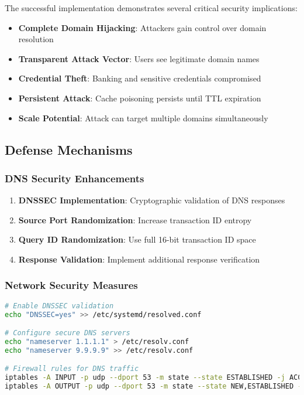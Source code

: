 \documentclass[12pt,a4paper]{article}
\begin{document}
The successful implementation demonstrates several critical security implications:

\begin{itemize}
    \item \textbf{Complete Domain Hijacking}: Attackers gain control over domain resolution
    \item \textbf{Transparent Attack Vector}: Users see legitimate domain names
    \item \textbf{Credential Theft}: Banking and sensitive credentials compromised
    \item \textbf{Persistent Attack}: Cache poisoning persists until TTL expiration
    \item \textbf{Scale Potential}: Attack can target multiple domains simultaneously
\end{itemize}

\subsection{Defense Mechanisms}

\subsubsection{DNS Security Enhancements}

\begin{enumerate}
    \item \textbf{DNSSEC Implementation}: Cryptographic validation of DNS responses
    \item \textbf{Source Port Randomization}: Increase transaction ID entropy
    \item \textbf{Query ID Randomization}: Use full 16-bit transaction ID space
    \item \textbf{Response Validation}: Implement additional response verification
\end{enumerate}

\subsubsection{Network Security Measures}

\begin{lstlisting}[language=bash, caption=DNS Security Configuration]
# Enable DNSSEC validation
echo "DNSSEC=yes" >> /etc/systemd/resolved.conf

# Configure secure DNS servers
echo "nameserver 1.1.1.1" > /etc/resolv.conf
echo "nameserver 9.9.9.9" >> /etc/resolv.conf

# Firewall rules for DNS traffic
iptables -A INPUT -p udp --dport 53 -m state --state ESTABLISHED -j ACCEPT
iptables -A OUTPUT -p udp --dport 53 -m state --state NEW,ESTABLISHED -j ACCEPT
\end{lstlisting}
\end{document}
